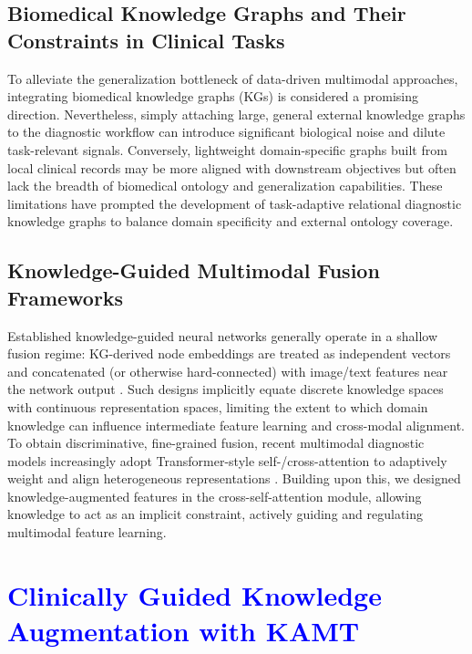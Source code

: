 \documentclass[lettersize,journal]{IEEEtran}
\begin{document}
\subsection{Biomedical Knowledge Graphs and Their Constraints in Clinical Tasks}

To alleviate the generalization bottleneck of data-driven multimodal approaches, integrating biomedical knowledge graphs (KGs) is considered a promising direction. Nevertheless, simply attaching large, general external knowledge graphs to the diagnostic workflow can introduce significant biological noise and dilute task-relevant signals. Conversely, lightweight domain-specific graphs built from local clinical records may be more aligned with downstream objectives but often lack the breadth of biomedical ontology and generalization capabilities. These limitations have prompted the development of task-adaptive relational diagnostic knowledge graphs to balance domain specificity and external ontology coverage.

\subsection{Knowledge-Guided Multimodal Fusion Frameworks}

    Established knowledge-guided neural networks generally operate in a shallow fusion regime: KG-derived node embeddings are treated as independent vectors and concatenated (or otherwise hard-connected) with image/text features near the network output \cite{chen2023knowledge}. Such designs implicitly equate discrete knowledge spaces with continuous representation spaces, limiting the extent to which domain knowledge can influence intermediate feature learning and cross-modal alignment. To obtain discriminative, fine-grained fusion, recent multimodal diagnostic models increasingly adopt Transformer-style self-/cross-attention to adaptively weight and align heterogeneous representations \cite{vaswani2017attention,kyritsis2025transformerfusionad,li2024hammf,du2025vitadreview,chen2026federatedvitad}. Building upon this, we designed knowledge-augmented  features in the cross-self-attention module, allowing knowledge to act as an implicit constraint, actively guiding and regulating multimodal feature learning.
    

    
\section{\textcolor{blue}{Clinically Guided Knowledge Augmentation with KAMT}}
\end{document}
